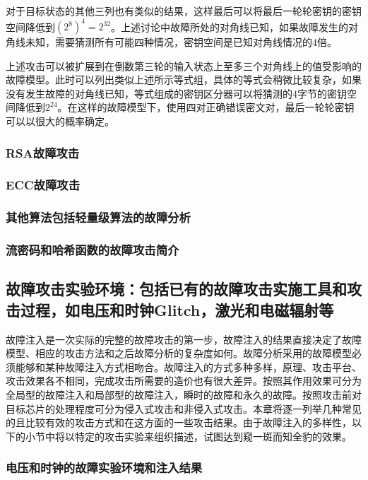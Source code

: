 \documentclass[a4paper,12pt]{article}
\begin{document}
\begin{CJK}{UTF8}{gkai}
对于目标状态的其他三列也有类似的结果，这样最后可以将最后一轮轮密钥的密钥空间降低到$(2^{8})^{4}=2^{32}$。上述讨论中故障所处的对角线已知，如果故障发生的对角线未知，需要猜测所有可能四种情况，密钥空间是已知对角线情况的4倍。

上述攻击可以被扩展到在倒数第三轮的输入状态上至多三个对角线上的值受影响的故障模型。此时可以列出类似上述所示等式组，具体的等式会稍微比较复杂，如果没有发生故障的对角线已知，等式组成的密钥区分器可以将猜测的4字节的密钥空间降低到$2^{24}$。在这样的故障模型下，使用四对正确错误密文对，最后一轮轮密钥可以以很大的概率确定。

\subsubsection{RSA故障攻击}
\subsubsection{ECC故障攻击}
\subsubsection{其他算法包括轻量级算法的故障分析}
\subsubsection{流密码和哈希函数的故障攻击简介}

\subsection{故障攻击实验环境：包括已有的故障攻击实施工具和攻击过程，如电压和时钟Glitch，激光和电磁辐射等}
故障注入是一次实际的完整的故障攻击的第一步，故障注入的结果直接决定了故障模型、相应的攻击方法和之后故障分析的复杂度如何。故障分析采用的故障模型必须能够和某种故障注入方式相吻合。故障注入的方式多种多样，原理、攻击平台、攻击效果各不相同，完成攻击所需要的造价也有很大差异。按照其作用效果可分为全局型的故障注入和局部型的故障注入，瞬时的故障和永久的故障。按照攻击前对目标芯片的处理程度可分为侵入式攻击和非侵入式攻击。本章将逐一列举几种常见的且比较有效的攻击方式和在这方面的一些攻击结果。由于故障注入的多样性，以下的小节中将以特定的攻击实验来组织描述，试图达到窥一斑而知全豹的效果。

\subsubsection{电压和时钟的故障实验环境和注入结果}


\end{CJK}
\end{document}
